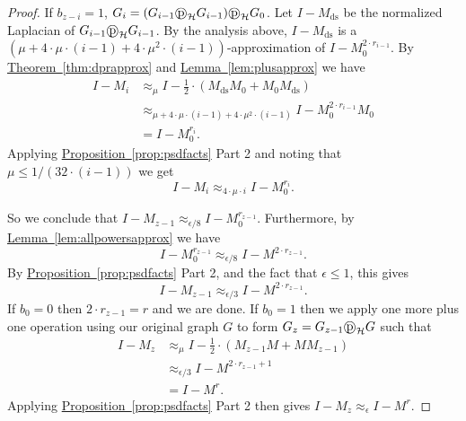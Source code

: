 \documentclass[11pt]{article}
\numberwithin{equation}{section}
\theoremstyle{definition}
\theoremstyle{plain}
\newcommand{\expref}[2]{\hyperref[#2]{#1~\ref{#2}}}
\newcommand{\dpr}{\text{\textcircled{p}}_{\mathcal{H}}}
\numberwithin{myalgctr}{section}
\theoremstyle{named}
\begin{document}
\begin{proof}
If $b_{z-i}=1$, $G_{i}=(G_{i-1}\dpr G_{i-1})\dpr G_0$. Let $I-M_{\mathrm{ds}}$ be the normalized Laplacian of $G_{i-1}\dpr G_{i-1}$. By the analysis above, $I-M_{\mathrm{ds}}$ is a $(\mu +4\cdot\mu\cdot (i-1)+4\cdot\mu^2\cdot (i-1))$-approximation of $I-M_0^{2\cdot r_{i-1}}$. By \expref{Theorem}{thm:dprapprox} and \expref{Lemma}{lem:plusapprox} we have 
\begin{align*}
I-M_i &\approx_{\mu} I-\frac{1}{2}\cdot(M_{\mathrm{ds}}M_0 + M_0M_{\mathrm{ds}})\\
&\approx_{\mu +4\cdot\mu\cdot (i-1)+4\cdot\mu^2\cdot (i-1)} I-M_0^{2\cdot r_{i-1}}M_0\\
&=I-M_0^{r_i}.
\end{align*}
Applying \expref{Proposition}{prop:psdfacts} Part 2 and noting that $\mu\leq 1/(32\cdot(i-1))$ we get
\[
I-M_i \approx_{4\cdot\mu\cdot i} I-M_0^{r_i}.
\]

So we conclude that $I-M_{z-1}\approx_{\epsilon/8}I-M_0^{r_{z-1}}$. Furthermore, by \expref{Lemma}{lem:allpowersapprox} we have 
\[
I-M_0^{r_{z-1}}\approx_{\epsilon/8}I-M^{2\cdot r_{z-1}}.
\]
By \expref{Proposition}{prop:psdfacts} Part 2, and the fact that $\epsilon\leq 1$, this gives
\[
I-M_{z-1}\approx_{\epsilon/3}I-M^{2\cdot r_{z-1}}.
\]
If $b_0=0$ then $2\cdot r_{z-1}=r$ and we are done. If $b_0=1$ then we apply one more plus one operation using our original graph $G$ to form $G_z=G_{z-1}\dpr G$ such that
\begin{align*}
I-M_z &\approx_{\mu} I-\frac{1}{2}\cdot (M_{z-1}M+MM_{z-1})\\
&\approx_{\epsilon/3}I-M^{2\cdot r_{z-1}+1}\\
&=I-M^{r}.
\end{align*}
Applying \expref{Proposition}{prop:psdfacts} Part 2 then gives $I-M_z \approx_{\epsilon} I-M^{r}$.
\end{proof}

%
\end{document}

